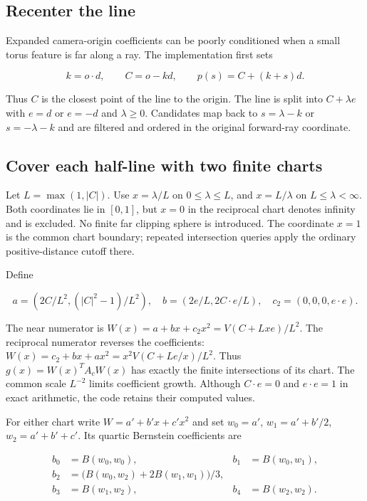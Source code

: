 \documentclass[11pt,a4paper]{article}
\begin{document}
\subsection{Recenter the line}\label{recenter-the-line}

Expanded camera-origin coefficients can be poorly conditioned when a
small torus feature is far along a ray. The implementation first sets

\[
k=o\cdot d,\qquad C=o-kd,\qquad p(s)=C+(k+s)d.
\]

Thus \(C\) is the closest point of the line to the origin. The line is
split into \(C+\lambda e\) with \(e=d\) or \(e=-d\) and
\(\lambda\geq0\). Candidates map back to \(s=\lambda-k\) or
\(s=-\lambda-k\) and are filtered and ordered in the original
forward-ray coordinate.

\subsection{Cover each half-line with two finite
charts}\label{cover-each-half-line-with-two-finite-charts}

Let \(L=\max(1,|C|)\). Use \(x=\lambda/L\) on \(0\leq\lambda\leq L\),
and \(x=L/\lambda\) on \(L\leq\lambda<\infty\). Both coordinates lie in
\([0,1]\), but \(x=0\) in the reciprocal chart denotes infinity and is
excluded. No finite far clipping sphere is introduced. The coordinate
\(x=1\) is the common chart boundary; repeated intersection queries
apply the ordinary positive-distance cutoff there.

Define

\[
a=(2C/L^2,(|C|^2-1)/L^2),\quad
b=(2e/L,2C\cdot e/L),\quad c_2=(0,0,0,e\cdot e).
\]

The near numerator is \(W(x)=a+bx+c_2x^2=V(C+Lxe)/L^2\). The reciprocal
numerator reverses the coefficients:
\(W(x)=c_2+bx+ax^2=x^2V(C+Le/x)/L^2\). Thus \(g(x)=W(x)^TA_cW(x)\) has
exactly the finite intersections of its chart. The common scale
\(L^{-2}\) limits coefficient growth. Although \(C\cdot e=0\) and
\(e\cdot e=1\) in exact arithmetic, the code retains their computed
values.

For either chart write \(W=a'+b'x+c'x^2\) and set \(w_0=a'\),
\(w_1=a'+b'/2\), \(w_2=a'+b'+c'\). Its quartic Bernstein coefficients
are

\[
\begin{aligned}
b_0&=B(w_0,w_0), & b_1&=B(w_0,w_1),\\
b_2&=\bigl(B(w_0,w_2)+2B(w_1,w_1)\bigr)/3,\\
b_3&=B(w_1,w_2), & b_4&=B(w_2,w_2).
\end{aligned}
\]
\end{document}

